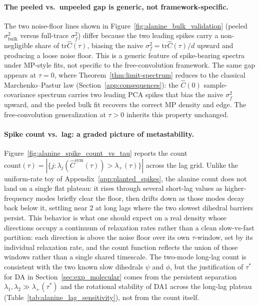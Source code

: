 \documentclass{article}
\newcommand{\tr}{\mathrm{tr}}
\begin{document}
\paragraph{The peeled vs.\ unpeeled gap is generic, not framework-specific.}
The two noise-floor lines shown in
Figure~\ref{fig:alanine_bulk_validation}
(peeled $\sigma^2_{\mathrm{bulk}}$ versus full-trace $\sigma^2_f$) differ
because the two leading spikes carry a non-negligible share of
$\tr\hat C(\tau)$, biasing the naive $\sigma^2_f = \tr\hat C(\tau)/d$
upward and producing a loose noise floor. This is a generic feature of
spike-bearing spectra under MP-style fits, not specific to the
free-convolution framework. The same gap appears at $\tau = 0$, where Theorem~\ref{thm:limit-spectrum} reduces to the classical Marchenko--Pastur law (Section~\ref{app:consequences}): the $\hat C(0)$ sample-covariance spectrum carries two leading PCA spikes that bias the naive $\sigma^2_f$ upward, and the peeled bulk fit recovers the correct MP density and edge. The free-convolution generalization at $\tau > 0$ inherits this property unchanged.

\iffalse
\paragraph{Spike count vs.\ lag: a graded picture of metastability.}
Figure~\ref{fig:alanine_spike_count_vs_tau} reports the count
$\mathrm{count}(\tau) = |\{j : \lambda_j(\hat C^{\mathrm{sym}}(\tau)) > \lambda_+(\tau)\}|$
across the lag grid. Unlike the uniform-rate toy of
Appendix~\ref{app:planted_spikes}, the alanine count does not land on a
single flat plateau: it rises through several short-lag values as
higher-frequency modes briefly clear the floor, then drifts down as
those modes decay back below it, settling near $2$ at long lags where
the two slowest dihedral barriers persist. This behavior is what one
should expect on a real density whose directions occupy a continuum
of relaxation rates rather than a clean slow-vs-fast partition: each
direction is above the noise floor over its own $\tau$-window, set by
its individual relaxation rate, and the count function reflects the
union of those windows rather than a single shared timescale. The
two-mode long-lag count is consistent with the two known slow
dihedrals $\psi$ and $\phi$, but the justification of $\tau^*$ for DA
in Section~\ref{sec:exp_molecular} comes from the persistent
separation $\lambda_1, \lambda_2 \gg \lambda_+(\tau^*)$ and the
rotational stability of DA1 across the long-lag plateau
(Table~\ref{tab:alanine_lag_sensitivity}), not from the count itself.
\end{document}
